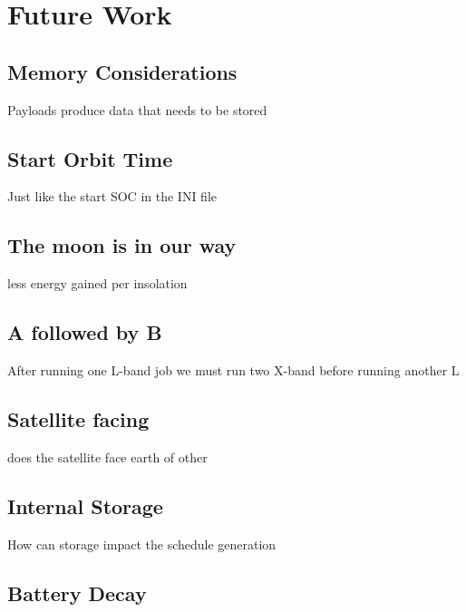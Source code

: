 \section{Future Work} \label{sec:future}

\subsection{Memory Considerations}
Payloads produce data that needs to be stored

\subsection{Start Orbit Time}
Just like the start SOC in the INI file

\subsection{The moon is in our way}
less energy gained per insolation

\subsection{A followed by B}
After running one L-band job we must run two X-band before running another L

\subsection{Satellite facing}
does the satellite face earth of other

\subsection{Internal Storage}
How can storage impact the schedule generation

\subsection{Battery Decay}